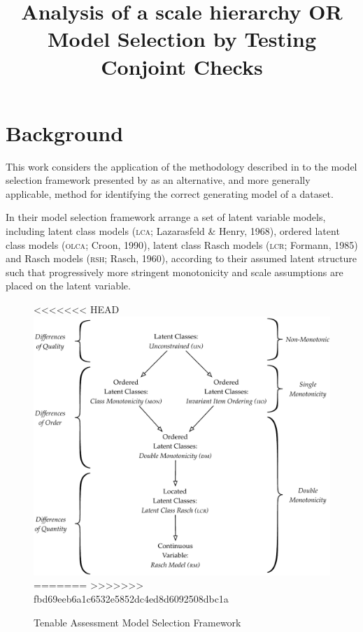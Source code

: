 \documentclass[12pt]{article}
\title{Analysis of a scale hierarchy OR Model Selection by Testing Conjoint Checks}
\date{}
\begin{document}
\maketitle
\onehalfspacing
\section{Background}
This work considers the application of the methodology described in  to the model selection framework presented by  as an alternative, and more generally applicable, method for identifying the correct generating model of a dataset.

In their model selection framework  arrange a set of latent variable models, including latent class models (\textsc{lca}; Lazarasfeld \& Henry, 1968), ordered latent class models (\textsc{olca}; Croon, 1990), latent class Rasch models (\textsc{lcr}; Formann, 1985) and Rasch models (\textsc{rsh}; Rasch, 1960), according to their assumed latent structure such that progressively more stringent monotonicity and scale assumptions are placed on the latent variable. 

\begin{figure}
\centering
\caption{Tenable Assessment Model Selection Framework} \label{orig}
<<<<<<< HEAD
\includegraphics[width=\textwidth]{./figs/TAmodelframework.pdf}
=======
>>>>>>> fbd69eeb6a1c6532e5852dc4ed8d6092508dbc1a
\end{figure}
\end{document}
